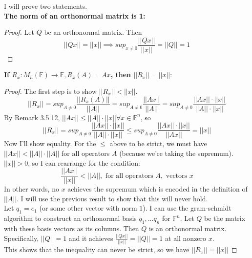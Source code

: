 \documentclass[12pt]{article}
\newenvironment{problem}[2][Problem]{\begin{trivlist}
\item[\hskip \labelsep {\bfseries #1}\hskip \labelsep {\bfseries #2.}]}{\end{trivlist}}
\theoremstyle{definition}
\theoremstyle{definition}
\theoremstyle{definition}
\theoremstyle{definition}
\begin{document}
\begin{problem}{3.29}
I will prove two statements. \\

\textbf{The norm of an orthonormal matrix is 1:}
\begin{proof}
Let $Q$ be an orthonormal matrix. Then 
$$ ||Qx|| = ||x|| \implies sup_{x\neq 0} \frac{||Qx||}{||x||} = ||Q|| = 1 $$
\end{proof}

\textbf{If $R_x : M_n(\mathbb{F}) \to  \mathbb{F} , R_x(A) = Ax$, then $||R_x||=||x||$}:
\begin{proof}
The first step is to show $||R_x|| < ||x||$. $$||R_x|| = sup_{A\neq 0} \frac{||R_x(A)||}{||A||} = sup_{A\neq 0} \frac{||Ax||}{||A||} = sup_{A\neq 0} \frac{||Ax||\cdot ||x||}{||A||\cdot ||x||}$$
By Remark 3.5.12, $||Ax|| \leq ||A|| \cdot ||x|| \forall x \in \mathbb{F}^n$, so $$||R_x|| =sup_{A \neq 0} \frac{||Ax||\cdot ||x||}{||A||\cdot ||x||} \leq sup_{A \neq 0}\frac{||Ax|| \cdot ||x||}{||Ax||} = ||x|| $$
Now I'll show equality. For the $\leq$ above to be strict, we must have $ ||Ax|| < ||A||\cdot||A|| $ for all operators $A$ (because we're taking the supremum). $||x|| > 0$, so I can rearrange for the condition: 
$$ \frac{||Ax||}{||x||} < ||A||, \text{ for all operators } A, \text{ vectors } x $$
In other words, no $x$ achieves the supremum which is encoded in the definition of $||A||$. I will use the previous result to show that this will never hold. \\
Let $q_1 = e_1$ (or some other vector with norm 1). I can use the gram-schmidt algorithm to construct an orthonormal basis $q_1, ... q_n$ for $\mathbb{F}^n$. Let $Q$ be the matrix with these basis vectors as its columns. Then $Q$ is an orthonormal matrix. Specifically, $||Q|| = 1$ and it achieves $\frac{||Qx||}{||x||} = ||Q|| = 1$ at all nonzero $x$. \\
This shows that the inequality can never be strict, so we have $||R_x|| = ||x||$
\end{proof} 
\end{problem}
\end{document}
